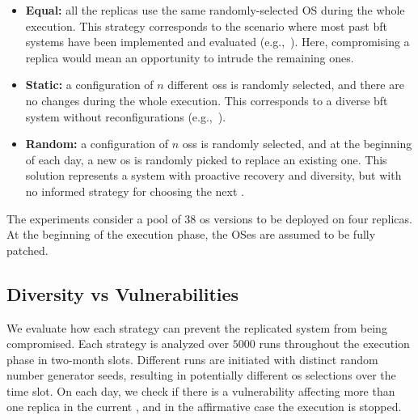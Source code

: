 \begin{itemize}
\item \textbf{Equal:} all the replicas use the same randomly-selected OS during the whole execution. 
This strategy corresponds to the scenario where most past \gls{bft} systems have been implemented and evaluated (e.g.,~\cite{Kotla:2010,Aublin:2015,Behl:2015,Veronese:2013,Behl:2017,Liu:2016,Yin:2003,Amir:2011,Bessani:2014,Clement:2009b}). 
Here, compromising a replica would mean an opportunity to intrude the remaining ones.

\item \textbf{Static:} a configuration of $n$ different \glspl{os} is randomly selected, and there are no changes during the whole execution. 
This corresponds to a diverse \gls{bft} system without reconfigurations (e.g.,~\cite{Castro:2003}).

\item \textbf{Random:} a configuration of $n$ \glspl{os} is randomly selected, and at the beginning of each day, a new \gls{os} is randomly picked to replace an existing one. 
This solution represents a system with proactive recovery and diversity, but with no informed strategy for choosing the next \configuration.

\end{itemize}

The experiments consider a pool of 38 \gls{os} versions to be deployed on four replicas. 
At the beginning of the execution phase, the OSes are assumed to be fully patched.




\subsection{Diversity vs Vulnerabilities}
We evaluate how each strategy can prevent the replicated system from being compromised. 
Each strategy is analyzed over $5000$ runs throughout the execution phase in two-month slots. 
Different runs are initiated with distinct random number generator seeds, resulting in potentially different \gls{os} selections over the time slot. 
On each day, we check if there is a vulnerability affecting more than one replica in the current \configuration, and in the affirmative case the execution is stopped.

